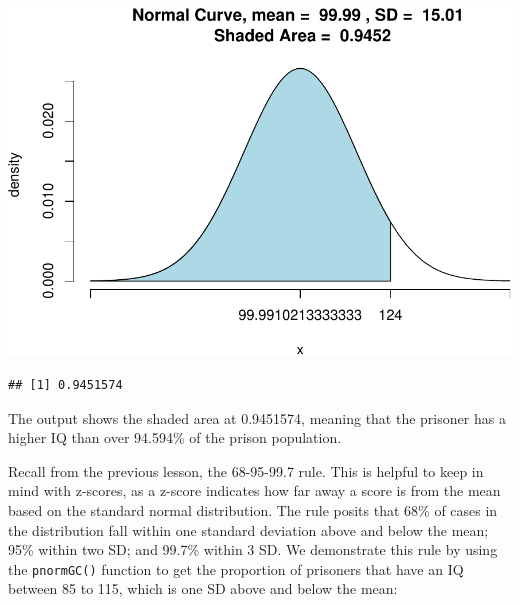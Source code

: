 \documentclass[
]{book}
\newenvironment{Shaded}{\begin{snugshade}}{\end{snugshade}}
\newcommand{\AttributeTok}[1]{\textcolor[rgb]{0.77,0.63,0.00}{#1}}
\newcommand{\CommentTok}[1]{\textcolor[rgb]{0.56,0.35,0.01}{\textit{#1}}}
\newcommand{\ConstantTok}[1]{\textcolor[rgb]{0.00,0.00,0.00}{#1}}
\newcommand{\DecValTok}[1]{\textcolor[rgb]{0.00,0.00,0.81}{#1}}
\newcommand{\FunctionTok}[1]{\textcolor[rgb]{0.00,0.00,0.00}{#1}}
\newcommand{\NormalTok}[1]{#1}
\newcommand{\OtherTok}[1]{\textcolor[rgb]{0.56,0.35,0.01}{#1}}
\newcommand{\SpecialCharTok}[1]{\textcolor[rgb]{0.00,0.00,0.00}{#1}}
\newcommand{\StringTok}[1]{\textcolor[rgb]{0.31,0.60,0.02}{#1}}
\begin{document}
\begin{Shaded}
\end{Shaded}

\includegraphics{06-hypotheses_files/figure-latex/unnamed-chunk-24-1.pdf}

\begin{verbatim}
## [1] 0.9451574
\end{verbatim}

The output shows the shaded area at 0.9451574, meaning that the prisoner has a higher IQ than over 94.594\% of the prison population.

Recall from the previous lesson, the 68-95-99.7 rule. This is helpful to keep in mind with z-scores, as a z-score indicates how far away a score is from the mean based on the standard normal distribution. The rule posits that 68\% of cases in the distribution fall within one standard deviation above and below the mean; 95\% within two SD; and 99.7\% within 3 SD. We demonstrate this rule by using the \texttt{pnormGC()} function to get the proportion of prisoners that have an IQ between 85 to 115, which is one SD above and below the mean:
\end{document}
